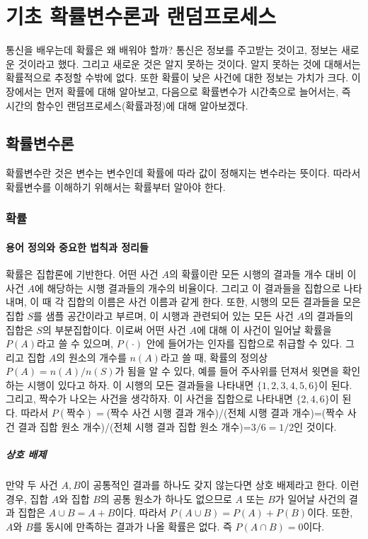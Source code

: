 \chapter{기초 확률변수론과 랜덤프로세스}
통신을 배우는데 확률은 왜 배워야 할까? 통신은 정보를 주고받는 것이고, 정보는 새로운 것이라고 했다.
그리고 새로운 것은 알지 못하는 것이다. 알지 못하는 것에 대해서는 확률적으로 추정할 수밖에 없다.
또한 확률이 낮은 사건에 대한 정보는 가치가 크다.
이 장에서는 먼저 확률에 대해 알아보고, 다음으로 확률변수가 시간축으로 늘어서는, 즉 시간의 함수인 랜덤프로세스(확률과정)에 대해 알아보겠다.

\section{확률변수론}
확률변수란 것은 변수는 변수인데 확률에 따라 값이 정해지는 변수라는 뜻이다. 따라서 확률변수를 이해하기 위해서는 확률부터 알아야 한다.
\subsection{확률}
\subsubsection{용어 정의와 중요한 법칙과 정리들}
확률은 집합론에 기반한다. 어떤 사건 $A$의 확률이란 모든 시행의 결과들 개수 대비 이 사건 $A$에 해당하는 시행 결과들의 개수의 비율이다.
그리고 이 결과들을 집합으로 나타내며, 이 때 각 집합의 이름은 사건 이름과 같게 한다.
또한, 시행의 모든 결과들을 모은 집합 $S$를 샘플 공간이라고 부르며, 이 시행과 관련되어 있는 모든 사건 $A$의 결과들의 집합은 $S$의 부분집합이다.
이로써 어떤 사건 $A$에 대해 이 사건이 일어날 확률을 $P(A)$라고 쓸 수 있으며, $P(\cdot)$ 안에 들어가는 인자를 집합으로 취급할 수 있다.
그리고 집합 $A$의 원소의 개수를 $n(A)$라고 쓸 때, 확률의 정의상 $P(A)=n(A)/n(S)$가 됨을 알 수 있다,
예를 들어 주사위를 던져서 윗면을 확인하는 시행이 있다고 하자. 이 시행의 모든 결과들을 나타내면 $\{1,2,3,4,5,6\}$이 된다.
그리고, 짝수가 나오는 사건을 생각하자. 이 사건을 집합으로 나타내면 $\{2,4,6\}$이 된다.
따라서 $P(짝수)=$(짝수 사건 시행 결과 개수)/(전체 시행 결과 개수)=(짝수 사건 결과 집합 원소 개수)/(전체 시행 결과 집합 원소 개수)=$3/6=1/2$인 것이다.
\paragraph{상호 배제}
만약 두 사건 $A,B$이 공통적인 결과를 하나도 갖지 않는다면 상호 배제라고 한다.
이런 경우, 집합 $A$와 집합 $B$의 공통 원소가 하나도 없으므로 $A$ 또는 $B$가 일어날 사건의 결과 집합은 $A\cup B=A+B$이다.
따라서 $P(A\cup B)=P(A)+P(B)$이다. 또한, $A$와 $B$를 동시에 만족하는 결과가 나올 확률은 없다. 즉 $P(A\cap B)=0$이다.
